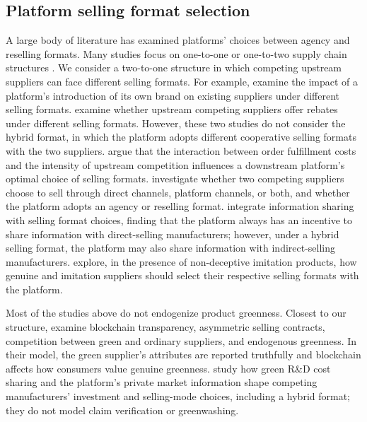 \documentclass[preprint,review,12pt,authoryear,nopreprintline]{elsarticle}
\theoremstyle{definition}
\begin{document}
\subsection{Platform selling format selection}\label{sec:2.2}

A large body of literature has examined platforms' choices between agency and reselling formats. Many studies focus on one-to-one or one-to-two supply chain structures \citep{Abhishek2016, ha2022channel, zha2023, Hsiao2024}. We consider a two-to-one structure in which competing upstream suppliers can face different selling formats. For example, \citet{cheng2023impact} examine the impact of a platform's introduction of its own brand on existing suppliers under different selling formats. \citet{jiang2024selling} examine whether upstream competing suppliers offer rebates under different selling formats. However, these two studies do not consider the hybrid format, in which the platform adopts different cooperative selling formats with the two suppliers. \citet{tian2018mark} argue that the interaction between order fulfillment costs and the intensity of upstream competition influences a downstream platform's optimal choice of selling formats. \citet{Matsui2024} investigate whether two competing suppliers choose to sell through direct channels, platform channels, or both, and whether the platform adopts an agency or reselling format. \citet{li2024selling} integrate information sharing with selling format choices, finding that the platform always has an incentive to share information with direct-selling manufacturers; however, under a hybrid selling format, the platform may also share information with indirect-selling manufacturers. \citet{yuan2025re} explore, in the presence of non-deceptive imitation products, how genuine and imitation suppliers should select their respective selling formats with the platform.

Most of the studies above do not endogenize product greenness. Closest to our structure, \citet{wu2025platform} examine blockchain transparency, asymmetric selling contracts, competition between green and ordinary suppliers, and endogenous greenness. In their model, the green supplier's attributes are reported truthfully and blockchain affects how consumers value genuine greenness. \citet{wuZhao2027cooperative} study how green R\&D cost sharing and the platform's private market information shape competing manufacturers' investment and selling-mode choices, including a hybrid format; they do not model claim verification or greenwashing.
\end{document}
